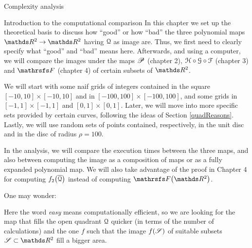\documentclass[11pt, a4paper, english, twoside, notitlepage, openright]{report}
\begin{document}
\begin{chapter}{Complexity analysis}\label{compChapter}

\begin{section}{Introduction to the computational comparison}\label{5sect1}
In this chapter we set up the theoretical basis to discuss how ``good'' or how ``bad'' the three polynomial maps $\R^2\to\R^2$ having ${\Qu}$ as image are. Thus, we first need to clearly specify what ``good'' and ``bad'' means here. Afterwards, and using a computer, we will compare the images under the maps $\P$ (chapter 2), $\HH\circ\GG\circ\FF$ (chapter 3) and $\FFF$ (chapter 4) of certain subsets of $\R^2$.

We will start with some naif grids of integers contained in the square $[-10, 10]\times[-10, 10]$ and in $[-100, 100]\times[-100, 100]$, and some grids in $[-1, 1]\times[-1, 1]$ and $[0, 1]\times[0, 1]$. Later, we will move into more specific sets provided by certain curves, following the ideas of  Section \ref{quadReasons}. Lastly, we will use random sets of points contained, respectively, in the unit disc and in the disc of radius $\rho=100$.

In the analysis, we will compare the execution times between the three maps, and also between computing the image as a composition of maps or as a fully expanded polynomial map. We will also take advantage of the proof in Chapter 4 for computing $f_2\big(\overline{\Qu}\big)$ instead of computing $\FFF\big(\R^2\big)$.

One may wonder:

\begin{center}
\end{center}

Here the word \textit{easy} means computationally efficient, so we are looking for the map that fills the open quadrant $\Qu$ quicker (in terms of the number of calculations) and the one $f$ such that the image $f(\Ss)$ of suitable subsets $\Ss\subset\R^2$ fill a bigger area.


\end{section}
\end{chapter}
\end{document}
